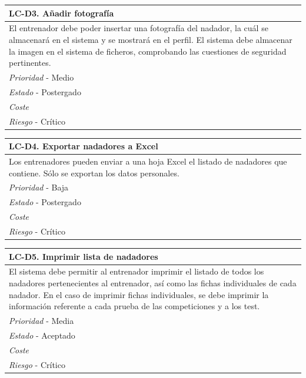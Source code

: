 	\begin{center}
		\begin{tabularx}{15cm}{|X|}
			\hline 
				\bf{LC-D3. Añadir fotografía}\\
			\hline
				El entrenador debe poder insertar una fotografía del nadador, la cuál se almacenará en el sistema y se mostrará en el perfil. El sistema debe almacenar la imagen en el sistema de ficheros, comprobando las cuestiones de seguridad pertinentes.\\
			\hline
				{\it Prioridad} - Medio\\
			\hline
				{\it Estado} - Postergado\\
			\hline
				{\it Coste}\\
			\hline
				{\it Riesgo} - Crítico\\
			\hline
		\end{tabularx}
	\end{center}
	
	\begin{center}
		\begin{tabularx}{15cm}{|X|}
			\hline 
				\bf{LC-D4. Exportar nadadores a Excel}\\
			\hline
				Los entrenadores pueden enviar a una hoja Excel el listado de nadadores que contiene. Sólo se exportan los datos personales.\\
			\hline
				{\it Prioridad} - Baja\\
			\hline
				{\it Estado} - Postergado\\
			\hline
				{\it Coste}\\
			\hline
				{\it Riesgo} - Crítico\\
			\hline
		\end{tabularx}
	\end{center}
	
	\begin{center}
		\begin{tabularx}{15cm}{|X|}
			\hline 
				\bf{LC-D5. Imprimir lista de nadadores}\\
			\hline
				El sistema debe permitir al entrenador imprimir el listado de todos los nadadores pertenecientes al entrenador, así como las fichas individuales de cada nadador. En el caso de imprimir fichas individuales, se debe imprimir la información referente a cada prueba de las competiciones y a los test.\\
			\hline
				{\it Prioridad} - Media\\
			\hline
				{\it Estado} - Aceptado\\
			\hline
				{\it Coste}\\
			\hline
				{\it Riesgo} - Crítico\\
			\hline
		\end{tabularx}
	\end{center}
	
